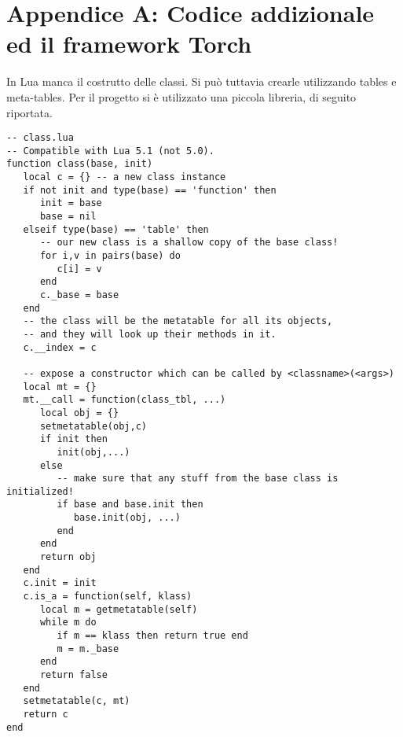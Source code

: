 
\chapter{Appendice A: Codice addizionale ed il framework Torch} %

\label{AppendixA} %

In Lua manca il costrutto delle classi. Si può tuttavia crearle utilizzando tables e meta-tables. Per il progetto si è utilizzato una piccola libreria, di seguito riportata. 

\begin{lstlisting}[language={[5.2]Lua}]
-- class.lua
-- Compatible with Lua 5.1 (not 5.0).
function class(base, init)
   local c = {} -- a new class instance
   if not init and type(base) == 'function' then
      init = base
      base = nil
   elseif type(base) == 'table' then
      -- our new class is a shallow copy of the base class!
      for i,v in pairs(base) do
         c[i] = v
      end
      c._base = base
   end
   -- the class will be the metatable for all its objects,
   -- and they will look up their methods in it.
   c.__index = c

   -- expose a constructor which can be called by <classname>(<args>)
   local mt = {}
   mt.__call = function(class_tbl, ...)
      local obj = {}
      setmetatable(obj,c)
      if init then
         init(obj,...)
      else
         -- make sure that any stuff from the base class is initialized!
         if base and base.init then
            base.init(obj, ...)
         end
      end
      return obj
   end
   c.init = init
   c.is_a = function(self, klass)
      local m = getmetatable(self)
      while m do
         if m == klass then return true end
         m = m._base
      end
      return false
   end
   setmetatable(c, mt)
   return c
end
\end{lstlisting}